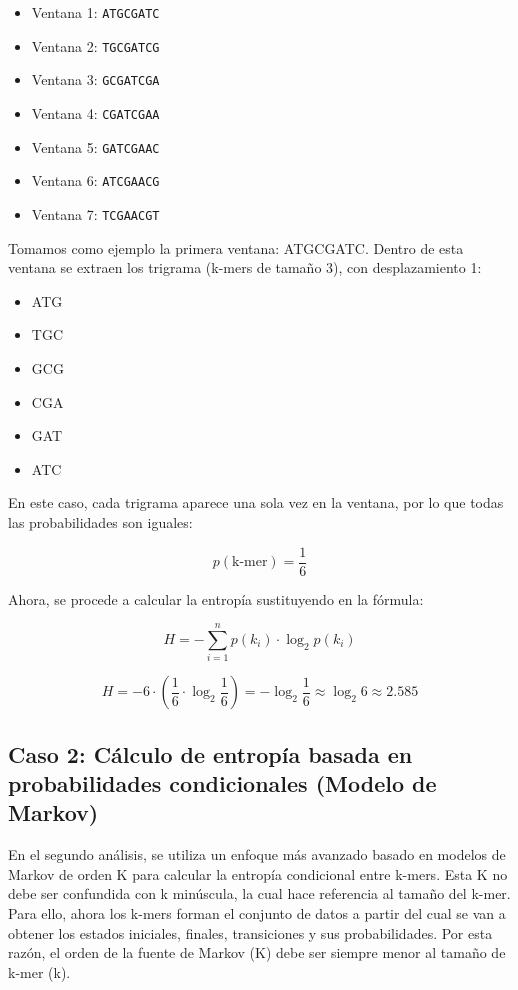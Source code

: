 \documentclass[11pt,spanish,listoffigures,listoftables]{tfgetsinf}
\begin{document}
\begin{itemize}
    \item Ventana 1: \texttt{ATGCGATC}
    \item Ventana 2: \texttt{TGCGATCG}
    \item Ventana 3: \texttt{GCGATCGA}
    \item Ventana 4: \texttt{CGATCGAA}
    \item Ventana 5: \texttt{GATCGAAC}
    \item Ventana 6: \texttt{ATCGAACG}
    \item Ventana 7: \texttt{TCGAACGT}
\end{itemize}

Tomamos como ejemplo la primera ventana: ATGCGATC. Dentro de esta ventana se extraen los trigrama (k-mers de tamaño 3), con desplazamiento 1:

\begin{itemize}
    \item ATG
    \item TGC
    \item GCG
    \item CGA
    \item GAT
    \item ATC
\end{itemize}

En este caso, cada trigrama aparece una sola vez en la ventana, por lo que todas las probabilidades son iguales:

\[
p(\text{k-mer}) = \frac{1}{6}
\]

Ahora, se procede a calcular la entropía sustituyendo en la fórmula:

\[
H = - \sum_{i=1}^{n} p(k_i) \cdot \log_2 p(k_i)
\]

\[
H = - 6 \cdot \left( \frac{1}{6} \cdot \log_2 \frac{1}{6} \right) = - \log_2 \frac{1}{6} \approx \log_2 6 \approx 2.585
\]


\subsection{Caso 2: Cálculo de entropía basada en probabilidades condicionales (Modelo de Markov)}

En el segundo análisis, se utiliza un enfoque más avanzado basado en modelos de Markov de orden K para calcular la entropía condicional entre k-mers. Esta K no debe ser confundida con k minúscula, la cual hace referencia al tamaño del k-mer. Para ello, ahora los k-mers forman el conjunto de datos a partir del cual se van a obtener los estados iniciales, finales, transiciones y sus probabilidades. Por esta razón, el orden de la fuente de Markov (K) debe ser siempre menor al tamaño de k-mer (k).
\end{document}
